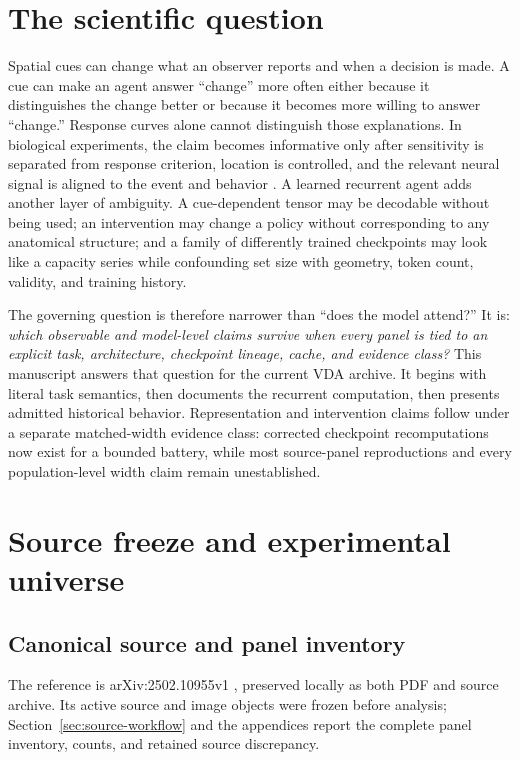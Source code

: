 \documentclass[11pt,a4paper]{article}
\begin{document}
\tableofcontents
\clearpage

\section{The scientific question}
Spatial cues can change what an observer reports and when a decision is made. A cue can make an agent answer ``change'' more often either because it distinguishes the change better or because it becomes more willing to answer ``change.'' Response curves alone cannot distinguish those explanations. In biological experiments, the claim becomes informative only after sensitivity is separated from response criterion, location is controlled, and the relevant neural signal is aligned to the event and behavior \cite{carrasco2011,herman2017,luo2018}. A learned recurrent agent adds another layer of ambiguity. A cue-dependent tensor may be decodable without being used; an intervention may change a policy without corresponding to any anatomical structure; and a family of differently trained checkpoints may look like a capacity series while confounding set size with geometry, token count, validity, and training history.

The governing question is therefore narrower than ``does the model attend?'' It is: \emph{which observable and model-level claims survive when every panel is tied to an explicit task, architecture, checkpoint lineage, cache, and evidence class?} This manuscript answers that question for the current VDA archive. It begins with literal task semantics, then documents the recurrent computation, then presents admitted historical behavior. Representation and intervention claims follow under a separate matched-width evidence class: corrected checkpoint recomputations now exist for a bounded battery, while most source-panel reproductions and every population-level width claim remain unestablished.

\section{Source freeze and experimental universe}
\subsection{Canonical source and panel inventory}
The reference is arXiv:2502.10955v1 \cite{mah2025}, preserved locally as both PDF and source archive. Its active source and image objects were frozen before analysis; Section~\ref{sec:source-workflow} and the appendices report the complete panel inventory, counts, and retained source discrepancy.
\end{document}
